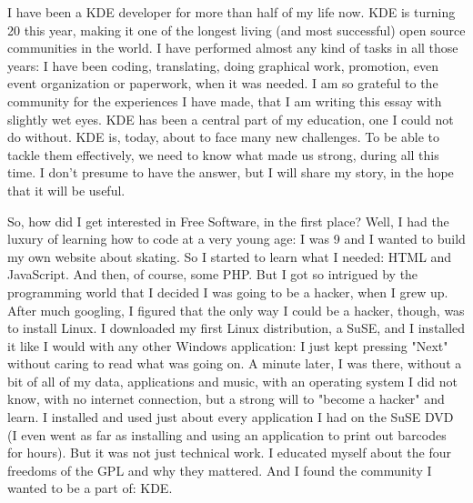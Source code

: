 

\noindent{}I have been a KDE developer for more than half of my life now. KDE is turning 20 this year, making it one of the longest living (and most successful) open source communities in the world. I have performed almost any kind of tasks in all those years: I have been coding, translating, doing graphical work, promotion, even event organization or paperwork, when it was needed. I am so grateful to the community for the experiences I have made, that I am writing this essay with slightly wet eyes. KDE has been a central part of my education, one I could not do without. KDE is, today, about to face many new challenges. To be able to tackle them effectively, we need to know what made us strong, during all this time. I don't presume to have the answer, but I will share my story, in the hope that it will be useful.

So, how did I get interested in Free Software, in the first place? Well, I had the luxury of learning how to code at a very young age: I was 9 and I wanted to build my own website about skating. So I started to learn what I needed: HTML and JavaScript. And then, of course, some PHP. But I got so intrigued by the programming world that I decided I was going to be a hacker, when I grew up. After much googling, I figured that the only way I could be a hacker, though, was to install Linux. I downloaded my first Linux distribution, a SuSE, and I installed it like I would with any other Windows application: I just kept pressing "Next" without caring to read what was going on. A minute later, I was there, without a bit of all of my data, applications and music, with an operating system I did not know, with no internet connection, but a strong will to "become a hacker" and learn. I installed and used just about every application I had on the SuSE DVD (I even went as far as installing and using an application to print out barcodes for hours). But it was not just technical work. I educated myself about the four freedoms of the GPL and why they mattered. And I found the community I wanted to be a part of: KDE.


